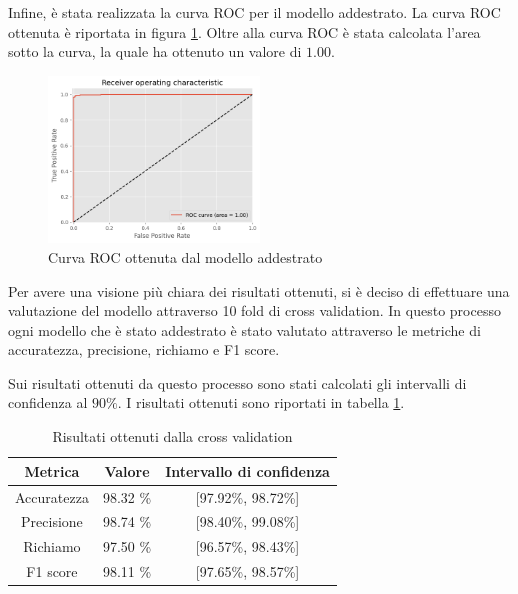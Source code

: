 Infine, è stata realizzata la curva ROC per il modello addestrato. La curva ROC
ottenuta è riportata in figura \ref{fig:curvaRocReteNeurale}. Oltre alla curva
ROC è stata calcolata l'area sotto la curva, la quale ha ottenuto un valore di
$1.00$.

\begin{figure}[!ht]
    \centering
    \includegraphics[width=0.5\textwidth]{img/rete/curva_roc.png}
    \caption{Curva ROC ottenuta dal modello addestrato}
    \label{fig:curvaRocReteNeurale}
\end{figure}

Per avere una visione più chiara dei risultati ottenuti, si è deciso di effettuare
una valutazione del modello attraverso 10 fold di cross validation. In questo
processo ogni modello che è stato addestrato è stato valutato attraverso le
metriche di accuratezza, precisione, richiamo e F1 score.

Sui risultati ottenuti da questo processo sono stati calcolati gli intervalli
di confidenza al $90\%$. I risultati ottenuti sono riportati in tabella \ref{tab:risultatiCrossValidation}.

\begin{table}[ht]
    \centering
    \begin{tabular}{|c|c|c|}
        \hline
        \textbf{Metrica} & \textbf{Valore} & \textbf{Intervallo di confidenza} \\
        \hline
        Accuratezza      & 98.32 \%        & [97.92\%, 98.72\%]                \\
        \hline
        Precisione       & 98.74 \%        & [98.40\%, 99.08\%]                \\
        \hline
        Richiamo         & 97.50 \%        & [96.57\%, 98.43\%]                \\
        \hline
        F1 score         & 98.11 \%        & [97.65\%, 98.57\%]                \\
        \hline
    \end{tabular}
    \caption{Risultati ottenuti dalla cross validation}
    \label{tab:risultatiCrossValidation}
\end{table}

